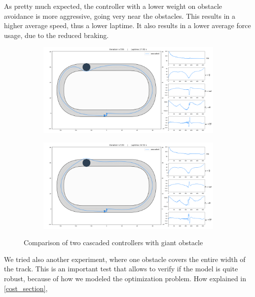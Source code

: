 \documentclass[a4paper, onecolumn, 12pt]{article}
\begin{document}
As pretty much expected, the controller with a lower weight on obstacle
avoidance is more aggressive, going very near the obstacles. This results in a
higher average speed, thus a lower laptime. It also results in a lower average
force usage, due to the reduced braking.
\begin{figure}[H]
    \centering
    \begin{subfigure}{0.9\textwidth}
        \centering
        \includegraphics[width=\textwidth]{assets/giant2.png}
        \label{giant2}
    \end{subfigure}
    \begin{subfigure}{0.9\textwidth}
        \centering
        \includegraphics[width=\textwidth]{assets/giant1.png}
        \label{giant1}
    \end{subfigure}
    \caption[short]{Comparison of two cascaded controllers with giant obstacle}
\end{figure}
We tried also another experiment, where one obstacle covers the entire width of the 
track. This is an important test that allows to verify if the model is quite robust,
because of how we modeled the optimization problem. How explained in \ref{cost_section},
\end{document}
